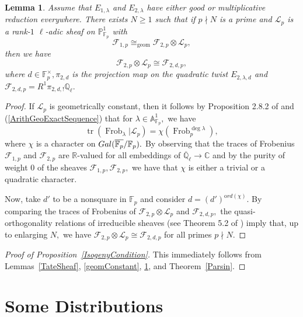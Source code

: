 \documentclass[12pt]{amsart}
\newtheorem{lemma}[theorem]{Lemma}
\theoremstyle{definition}
\theoremstyle{remark}
\numberwithin{equation}{section}
\def\C{\mathbb C}
\def\A{\mathbb A}
\def\Gal{{\rm Gal}}
\def\F{{\mathbb F}}
\def\Q{{\mathbb Q}}
\def \R {\mathcal R}
\def\ord{{\mathrm ord}}
\def\C{\mathbb{C}}
\def\R{\mathbb{R}}
\def\Q{\mathbb{Q}}
\def\F{\mathbb{F}}
\DeclareMathOperator{\Frob}{Frob}
\DeclareMathOperator{\tr}{tr}
\DeclareMathOperator{\geom}{geom}
\begin{document}
\begin{lemma}\label{geomConstantQuad}
    Assume that $E_{1,\lambda}$ and $E_{2,\lambda}$ have either good or multiplicative reduction everywhere. There exists $N\geq 1$ such that if $p\nmid N$ is a prime and $\mathcal{L}_p$ is a rank-$1$ $\ell$-adic sheaf on $\mathbb{P}_{\F_p}^1$ with
    $$
    \mathcal{F}_{1,p}\cong_{\geom}\mathcal{F}_{2,p}\otimes\mathcal{L}_p,    
    $$
    then we have
    $$
    \mathcal{F}_{2,p}\otimes\mathcal{L}_p\cong\mathcal{F}_{2,d,p},
    $$
    where $d\in\F_p^\times, \pi_{2,d}$ is the projection map on the quadratic twist $E_{2,\lambda,d}$ and $\mathcal{F}_{2,d,p}=R^1\pi_{2,d,!}\Q_\ell.$
\end{lemma}

\begin{proof}
    If $\mathcal{L}_p$ is geometrically constant, then it follows by Proposition 2.8.2 of \cite{KowalskiRep} and (\ref{ArithGeoExactSequence}) that for $\lambda\in\A_{\F_p}^1,$ we have
    $$
    \tr(\Frob_\lambda|\mathcal{L}_p)=\chi(\Frob_p^{\deg \lambda}),
    $$
    where $\chi$ is a character on $\Gal(\overline{\F_p}/\F_p).$ By observing that the traces of Frobenius $\mathcal{F}_{1,p}$ and $\mathcal{F}_{2,p}$ are $\R$-valued for all embeddings of $\overline{\Q}_\ell\to\C$ and by the purity of weight $0$ of the sheaves $\mathcal{F}_{1,p},\mathcal{F}_{2,p},$ we have that $\chi$ is either a trivial or a quadratic character. 
    
    Now, take $d'$ to be a nonsquare in $\F_p$ and consider $d=(d')^{\ord(\chi)}.$ By comparing the traces of Frobenius of $\mathcal{F}_{2,p}\otimes\mathcal{L}_p$ and $\mathcal{F}_{2,d,p},$  the quasi-orthogonality relations of irreducible sheaves (see Theorem 5.2 of \cite{AppliedladicCohomology}) imply that, up to enlarging $N,$ we have $\mathcal{F}_{2,p}\otimes\mathcal{L}_p\cong\mathcal{F}_{2,d,p}$ for all primes $p\nmid N.$
\end{proof}

\begin{proof}[Proof of Proposition~\ref{IsogenyCondition}]
    This immediately follows from Lemmas~\ref{TateSheaf}, \ref{geomConstant}, \ref{geomConstantQuad}, and Theorem~\ref{Parsin}.
\end{proof}



\section{Some Distributions}\label{Section7}
\end{document}
